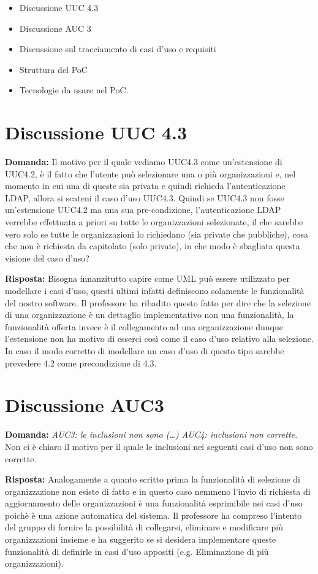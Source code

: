 \documentclass{article}
\begin{document}
\begin{itemize}
  \item Discussione UUC 4.3
  \item Discussione AUC 3
  \item Discussione sul tracciamento di casi d'uso e requisiti
  \item Struttura del PoC
  \item Tecnologie da usare nel PoC.
\end{itemize}
\section{Discussione UUC 4.3}%
\label{sec:discussione_uuc_4.3}
\textbf{Domanda:} Il motivo per il quale vediamo UUC4.3 come un'estensione di UUC4.2, è il fatto che l'utente può selezionare una o più organizzazioni e, nel momento in cui una di queste sia privata e quindi richieda l'autenticazione LDAP, allora si scateni il caso d'uso UUC4.3. Quindi se UUC4.3 non fosse un'estensione UUC4.2 ma una sua pre-condizione, l'autenticazione LDAP verrebbe effettuata a priori su tutte le organizzazioni selezionate, il che sarebbe vero solo se tutte le organizzazioni lo richiedano (sia private che pubbliche), cosa che non è richiesta da capitolato (solo private), in che modo è sbagliata questa visione del caso d'uso?

\textbf{Risposta:} Bisogna innanzitutto capire come UML può essere utilizzato per modellare i casi d'uso, questi ultimi infatti definiscono solamente le funzionalità del nostro software. Il professore ha ribadito questo fatto per dire che la selezione di una organizzazione è un dettaglio implementativo non una funzionalità, la funzionalità offerta invece è il collegamento ad una organizzazione dunque l'estensione non ha motivo di esserci così come il caso d'uso relativo alla selezione.
In caso il modo corretto di modellare un caso d'uso di questo tipo sarebbe prevedere 4.2 come precondizione di 4.3.
\section{Discussione AUC3}%
\label{sec:discussione_auc3}
\textbf{Domanda:} \textit{AUC3: le inclusioni non sono (\ldots) AUC4: inclusioni non corrette.} Non ci è chiaro il motivo per il quale le inclusioni nei seguenti casi d'uso non sono corrette.

\textbf{Risposta:} Analogamente a quanto scritto prima la funzionalità di selezione di organizzazione non esiste di fatto e in questo caso nemmeno l'invio di richiesta di aggiornamento delle organizzazioni è una funzionalità esprimibile nei casi d'uso poichè è una azione automatica del sistema.
Il professore ha compreso l'intento del gruppo di fornire la possibilità di collegarsi, eliminare e modificare più organizzazioni insieme e ha suggerito se si desidera implementare queste funzionalità di definirle in casi d'uso appositi (e.g. Eliminazione di più organizzazioni).
\end{document}
